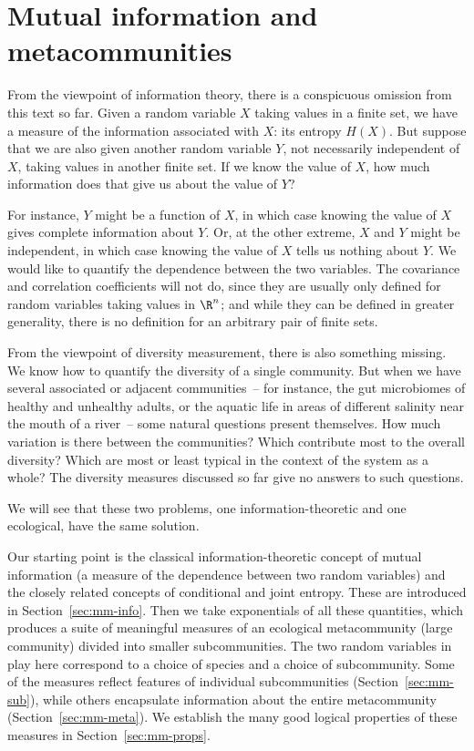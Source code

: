 \chapter{Mutual information and metacommunities}

From the viewpoint of information theory, there is a conspicuous omission
from this text so far.  Given a random variable $X$ taking values in a
finite set, we have a measure of the information associated with $X$:
its entropy $H(X)$.  But suppose that we are also given another
random variable $Y$, not necessarily independent of $X$, taking values in
another finite set.  If we know the value of $X$, how much information does
that give us about the value of $Y$?

For instance, $Y$ might be a function of $X$, in which case knowing the
value of $X$ gives complete information about $Y$.  Or, at the other
extreme, $X$ and $Y$ might be independent, in which case knowing the
value of $X$ tells us nothing about $Y$.  We would like to quantify the
dependence between the two variables.  The covariance and correlation
coefficients will not do, since they are usually only defined
for random variables taking values in $\R^n$; and while they can be defined
in greater generality, there is no definition for an arbitrary pair of
finite sets.

From the viewpoint of diversity measurement, there is also something
missing.  We know how to quantify the diversity of a single community.
But when we have several associated or adjacent communities~-- for instance,
the gut%
%
%
% 
microbiomes of healthy and unhealthy adults, or the aquatic life in areas
of different salinity near the mouth of a river~-- some
natural questions present themselves.  How much variation is there between
the communities?  Which contribute most to the overall diversity?  Which
are most or least typical in the context of the system as a whole?  The
diversity measures discussed so far give no answers to such questions.

We will see that these two problems, one information-theoretic and one
ecological, have the same solution. 

Our starting point is the classical information-theoretic concept of mutual
information (a measure of the dependence between two random variables) and
the closely related concepts of conditional and joint entropy.  These are
introduced in Section~\ref{sec:mm-info}.  Then we take exponentials of all
these quantities, which produces a suite of meaningful measures of an
ecological metacommunity (large community) divided into smaller
subcommunities.  The two random variables in play here correspond to a
choice of species and a choice of subcommunity.  Some of the measures
reflect features of individual subcommunities (Section~\ref{sec:mm-sub}),
while others encapsulate information about the entire metacommunity
(Section~\ref{sec:mm-meta}).  We establish the many good logical properties
of these measures in Section~\ref{sec:mm-props}.

